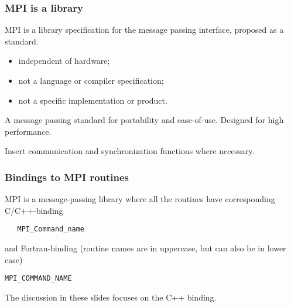 \documentclass{beamer}
\begin{document}
\begin{frame}
\frametitle{MPI is a library}

\begin{block}{}
MPI is a library specification for the message passing interface,
proposed as a standard.

\begin{itemize}
\item independent of hardware;

\item not a language or compiler specification;

\item not a specific implementation or product.
\end{itemize}

\noindent
A message passing standard for portability and ease-of-use. 
Designed for high performance.

Insert communication and synchronization functions where necessary.

\end{block}
\end{frame}

\begin{frame}
\frametitle{Bindings to MPI routines}

\begin{block}{}

MPI is a message-passing library where all the routines
have corresponding C/C++-binding


\begin{verbatim}
   MPI_Command_name

\end{verbatim}

and Fortran-binding (routine names are in uppercase, but can also be in lower case)


\begin{Verbatim}[numbers=none,fontsize=\fontsize{9pt}{9pt},baselinestretch=0.95]
   MPI_COMMAND_NAME

\end{Verbatim}

The discussion in these slides focuses on the C++ binding.

\end{block}
\end{frame}
\end{document}

